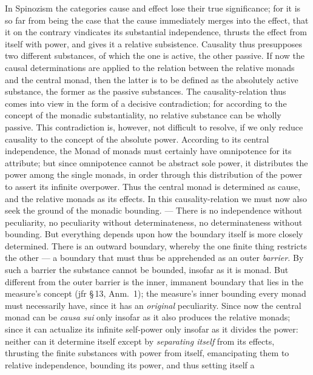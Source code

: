 \documentclass[12pt]{book}
\begin{document}
In Spinozism the categories cause and effect lose their true significance;
for it is so far from being the case that the cause immediately merges into
the effect, that it on the contrary vindicates its substantial independence,
thrusts the effect from itself with power, and gives it a relative
subsistence. Causality thus presupposes two different substances, of which
the one is active, the other passive. If now the causal determinations are
applied to the relation between the relative monads and the central monad,
then the latter is to be defined as the absolutely active substance, the
former as the passive substances. The causality-relation thus comes into
view in the form of a decisive contradiction; for according to the concept
of the monadic substantiality, no relative substance can be wholly passive.
This contradiction is, however, not difficult to resolve, if we only reduce
causality to the concept of the absolute power. According to its central
independence, the Monad of monads must certainly have omnipotence for its
attribute; but since omnipotence cannot be abstract sole power, it
distributes the power among the single monads, in order through this
distribution of the power to assert its infinite overpower. Thus the central
monad is determined as cause, and the relative monads as its effects. In
this causality-relation we must now also seek the ground of the monadic
bounding. --- There is no independence without peculiarity, no peculiarity
without determinateness, no determinateness without bounding. But everything
depends upon how the boundary itself is more closely determined. There is an
outward boundary, whereby the one finite thing restricts the other --- a
boundary that must thus be apprehended as an outer \emph{barrier.} By such a
barrier the substance cannot be bounded, insofar as it is monad. But
different from the outer barrier is the inner, immanent boundary that lies
in the measure's concept (jfr \S\,13, Anm.\ 1); the measure's inner bounding
every monad must necessarily have, since it has an \emph{original}
peculiarity. Since now the central monad can be \textit{causa sui} only
insofar as it also produces the relative monads; since it can actualize its
infinite self-power only insofar as it divides the power: neither can it
determine itself except by \emph{separating itself} from its effects,
thrusting the finite substances with power from itself, emancipating them to
relative independence, bounding its power, and thus setting itself a
\end{document}
